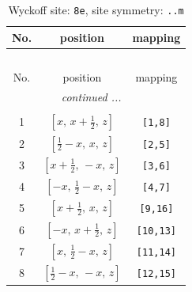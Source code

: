 \documentclass[fleqn,8pt]{jsarticle}
\begin{document}
\renewcommand{\arraystretch}{1.2}
\begin{longtable}{ccc}
\caption{Wyckoff site: {\tt 8e}, site symmetry: {\tt ..m}}
 \\
 \hline \hline
No. & position & mapping \\ \hline \endfirsthead

\multicolumn{2}{l}{\tablename\ \thetable{}} \\
 \hline \hline
No. & position & mapping \\ \hline \endhead

 \hline \hline
\multicolumn{2}{r}{\footnotesize\it continued ...} \\ \endfoot

 \hline \hline
\multicolumn{2}{r}{} \\ \endlastfoot

1 & $\left[ x,\, x + \frac{1}{2},\, z \right]$ & {\tt [1,8]} \\ \hline
2 & $\left[ \frac{1}{2} - x,\, x,\, z \right]$ & {\tt [2,5]} \\ \hline
3 & $\left[ x + \frac{1}{2},\, - x,\, z \right]$ & {\tt [3,6]} \\ \hline
4 & $\left[ - x,\, \frac{1}{2} - x,\, z \right]$ & {\tt [4,7]} \\ \hline
5 & $\left[ x + \frac{1}{2},\, x,\, z \right]$ & {\tt [9,16]} \\ \hline
6 & $\left[ - x,\, x + \frac{1}{2},\, z \right]$ & {\tt [10,13]} \\ \hline
7 & $\left[ x,\, \frac{1}{2} - x,\, z \right]$ & {\tt [11,14]} \\ \hline
8 & $\left[ \frac{1}{2} - x,\, - x,\, z \right]$ & {\tt [12,15]} \\
\end{longtable}
\renewcommand{\arraystretch}{1.2}
\end{document}
